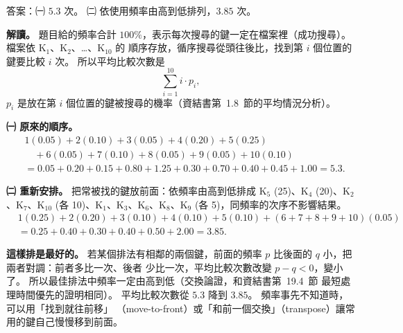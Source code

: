 \begin{pastsoln}
答案：㈠ $5.3$ 次。 ㈡ 依使用頻率由高到低排列，$3.85$ 次。

\textbf{解讀。} 題目給的頻率合計 $100\%$，表示每次搜尋的鍵一定在檔案裡（成功搜尋）。 檔案依 K$_1$、K$_2$、…、K$_{10}$ 的
順序存放，循序搜尋從頭往後比，找到第 $i$ 個位置的鍵要比較 $i$ 次。 所以平均比較次數是
\[
\sum_{i=1}^{10} i \cdot p_i,
\]
$p_i$ 是放在第 $i$ 個位置的鍵被搜尋的機率（資結書第~1.8~節的平均情況分析）。

\textbf{㈠ 原來的順序。}
\[
\begin{aligned}
&1(0.05) + 2(0.10) + 3(0.05) + 4(0.20) + 5(0.25) \\
&\quad + 6(0.05) + 7(0.10) + 8(0.05) + 9(0.05) + 10(0.10) \\
&= 0.05 + 0.20 + 0.15 + 0.80 + 1.25 + 0.30 + 0.70 + 0.40 + 0.45 + 1.00 = 5.3.
\end{aligned}
\]

\textbf{㈡ 重新安排。} 把常被找的鍵放前面：依頻率由高到低排成
K$_5$ (25)、K$_4$ (20)、K$_2$、K$_7$、K$_{10}$ (各 10)、K$_1$、K$_3$、K$_6$、K$_8$、K$_9$ (各 5)，同頻率的次序不影響結果。
\[
\begin{aligned}
&1(0.25) + 2(0.20) + 3(0.10) + 4(0.10) + 5(0.10) + (6 + 7 + 8 + 9 + 10)(0.05) \\
&= 0.25 + 0.40 + 0.30 + 0.40 + 0.50 + 2.00 = 3.85.
\end{aligned}
\]

\textbf{這樣排是最好的。} 若某個排法有相鄰的兩個鍵，前面的頻率 $p$ 比後面的 $q$ 小，把兩者對調：前者多比一次、後者
少比一次，平均比較次數改變 $p - q < 0$，變小了。 所以最佳排法中頻率一定由高到低（交換論證，和資結書第~19.4~節
最短處理時間優先的證明相同）。 平均比較次數從 $5.3$ 降到 $3.85$。 頻率事先不知道時，可以用「找到就往前移」
（move-to-front）或「和前一個交換」（transpose）讓常用的鍵自己慢慢移到前面。
\end{pastsoln}
